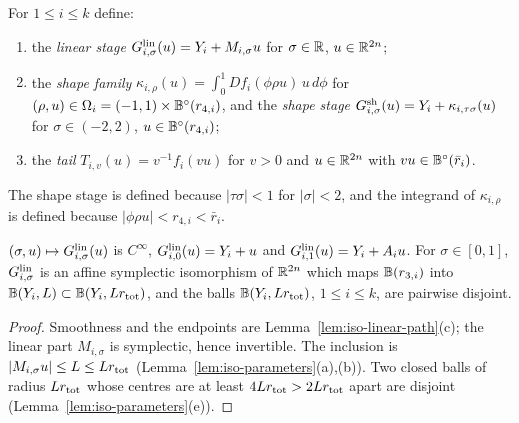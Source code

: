 \begin{definition}\label{def:iso-stages}
For $1\le i\le k$ define:
\begin{enumerate}[label=(\roman*)]
\item the \emph{linear stage} $G^{\rm lin}_{i,\sigma}(u)=Y_i+M_{i,\sigma}u$ for $\sigma\in\mathbb{R}$, $u\in\mathbb{R}^{2n}$;
\item the \emph{shape family} $\kappa_{i,\rho}(u)=\int_0^1Df_i(\phi\rho u)\,u\,d\phi$ for
 $(\rho,u)\in\Omega_i=(-1,1)\times\mathbb{B}^\circ(r_{4,i})$, and the \emph{shape stage}
 $G^{\rm sh}_{i,\sigma}(u)=Y_i+\kappa_{i,\tau\sigma}(u)$ for $\sigma\in(-2,2)$, $u\in\mathbb{B}^\circ(r_{4,i})$;
\item the \emph{tail} $T_{i,v}(u)=v^{-1}f_i(vu)$ for $v>0$ and $u\in\mathbb{R}^{2n}$ with $vu\in\mathbb{B}^\circ(\bar r_i)$.
\end{enumerate}
\end{definition}

The shape stage is defined because $|\tau\sigma|<1$ for $|\sigma|<2$, and the integrand of $\kappa_{i,\rho}$ is defined because
$|\phi\rho u|<r_{4,i}<\bar r_i$.

\begin{lemma}\label{lem:iso-linear-disjoint}
$(\sigma,u)\mapsto G^{\rm lin}_{i,\sigma}(u)$ is $C^\infty$, $G^{\rm lin}_{i,0}(u)=Y_i+u$ and $G^{\rm lin}_{i,1}(u)=Y_i+A_iu$. For
$\sigma\in[0,1]$, $G^{\rm lin}_{i,\sigma}$ is an affine symplectic isomorphism of $\mathbb{R}^{2n}$ which maps $\mathbb{B}(r_{3,i})$ into
$\mathbb{B}(Y_i,L)\subset\mathbb{B}(Y_i,Lr_{\rm tot})$, and the balls $\mathbb{B}(Y_i,Lr_{\rm tot})$, $1\le i\le k$, are pairwise disjoint.
\end{lemma}

\begin{proof}
Smoothness and the endpoints are Lemma~\ref{lem:iso-linear-path}(c); the linear part $M_{i,\sigma}$ is symplectic, hence
invertible. The inclusion is $|M_{i,\sigma}u|\le L\le Lr_{\rm tot}$ (Lemma~\ref{lem:iso-parameters}(a),(b)). Two closed balls of
radius $Lr_{\rm tot}$ whose centres are at least $4Lr_{\rm tot}>2Lr_{\rm tot}$ apart are disjoint
(Lemma~\ref{lem:iso-parameters}(e)).
\end{proof}

